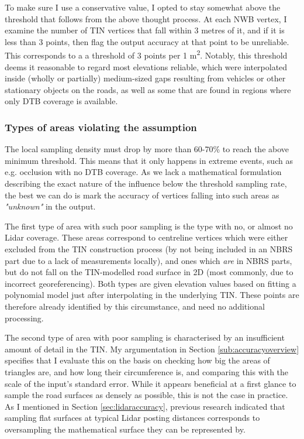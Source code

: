 To make sure I use a conservative value, I opted to stay somewhat above the threshold that follows from the above thought process. At each NWB vertex, I examine the number of TIN vertices that fall within 3 metres of it, and if it is less than 3 points, then flag the output accuracy at that point to be unreliable. This corresponds to a a threshold of 3 points per 1 m\textsuperscript{2}. Notably, this threshold deems it reasonable to regard most elevations reliable, which were interpolated inside (wholly or partially) medium-sized gaps resulting from vehicles or other stationary objects on the roads, as well as some that are found in regions where only DTB coverage is available.

\subsubsection{Types of areas violating the assumption}

The local sampling density must drop by more than 60-70\% to reach the above minimum threshold. This means that it only happens in extreme events, such as e.g. occlusion with no DTB coverage. As we lack a mathematical formulation describing the exact nature of the influence below the threshold sampling rate, the best we can do is mark the accuracy of vertices falling into such areas as \textit{"unknown"} in the output.

The first type of area with such poor sampling is the type with no, or almost no Lidar coverage. These areas correspond to centreline vertices which were either excluded from the TIN construction process (by not being included in an NBRS part due to a lack of measurements locally), and ones which \textit{are} in NBRS parts, but do not fall on the TIN-modelled road surface in 2D (most commonly, due to incorrect georeferencing). Both types are given elevation values based on fitting a polynomial model just after interpolating in the underlying TIN. These points are therefore already identified by this circumstance, and need no additional processing.

The second type of area with poor sampling is characterised by an insufficient amount of detail in the TIN. My argumentation in Section \ref{sub:accuracyoverview} specifies that I evaluate this on the basis on checking how big the areas of triangles are, and how long their circumference is, and comparing this with the scale of the input's standard error. While it appears beneficial at a first glance to sample the road surfaces as densely as possible, this is not the case in practice. As I mentioned in Section \ref{sec:lidaraccuracy}, previous research indicated that sampling flat surfaces at typical Lidar posting distances corresponds to oversampling the mathematical surface they can be represented by.

